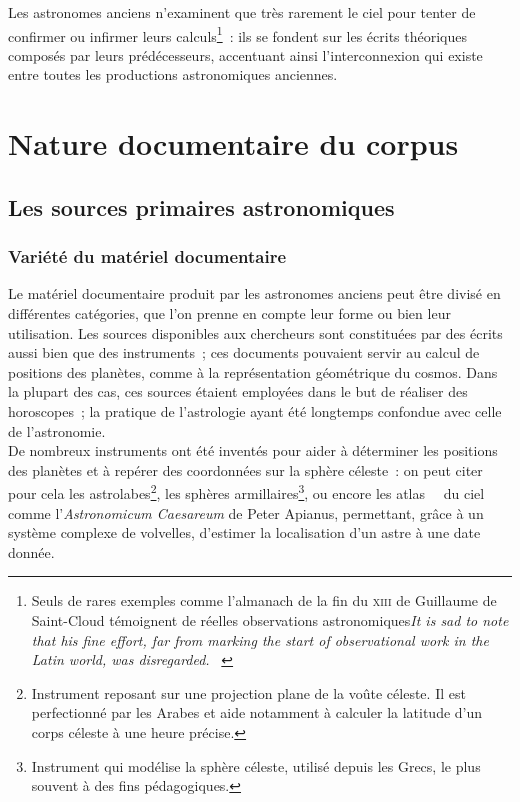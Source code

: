 \documentclass[a4paper,12pt,twoside]{book}
\newcommand{\eng}{\emph}
\newcommand{\XIII}{\textsc{xiii}\ieme{}\xspace}
\newcommand{\g}[1]{\og#1~\fg}
\begin{document}
Les astronomes anciens n'examinent que très rarement le ciel pour tenter de confirmer ou infirmer leurs calculs\footnote{Seuls de rares exemples comme l'almanach de la fin du \XIII de Guillaume de Saint-Cloud témoignent de réelles observations astronomiques\g{\eng{It is sad to note that his fine effort, far from marking the start of observational work in the Latin world, was disregarded.}} \cite[p.~22]{mercierStudiesTransmissionMedieval2004}}~: ils se fondent sur les écrits théoriques composés par leurs prédécesseurs, accentuant ainsi l'interconnexion qui existe entre toutes les productions astronomiques anciennes.

	\section{Nature documentaire du corpus}
		\subsection{Les sources primaires astronomiques}
			\subsubsection{Variété du matériel documentaire}
Le matériel documentaire produit par les astronomes anciens peut être divisé en différentes catégories, que l'on prenne en compte leur forme ou bien leur utilisation. Les sources disponibles aux chercheurs sont constituées par des écrits aussi bien que des instruments~; ces documents pouvaient servir au calcul de positions des planètes, comme à la représentation géométrique du cosmos. Dans la plupart des cas, ces sources étaient employées dans le but de réaliser des horoscopes~; la pratique de l'astrologie ayant été longtemps confondue avec celle de l'astronomie.\\

De nombreux instruments ont été inventés pour aider à déterminer les positions des planètes et à repérer des coordonnées sur la sphère céleste~: on peut citer pour cela les astrolabes\footnote{Instrument reposant sur une projection plane de la voûte céleste. Il est perfectionné par les Arabes et aide notamment à calculer la latitude d'un corps céleste à une heure précise.}, les sphères armillaires\footnote{Instrument qui modélise la sphère céleste, utilisé depuis les Grecs, le plus souvent à des fins pédagogiques.}, ou encore les \g{atlas}~ du ciel comme l'\emph{Astronomicum Caesareum} de Peter Apianus, permettant, grâce à un système complexe de volvelles, d'estimer la localisation d'un astre à une date donnée.
\end{document}
